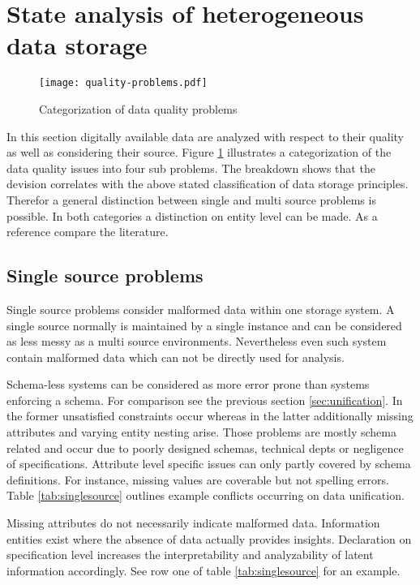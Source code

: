 \section{State analysis of heterogeneous data storage\label{sec:stateanalysis}}

\begin{figure}[htb]
  \centering
  \texttt{[image: quality-problems.pdf]}\\
  \caption{Categorization of data quality problems}\label{fig:qualityproblems}
\end{figure}

In this section digitally available data are analyzed with respect to their quality as well as considering their source. Figure \ref{fig:qualityproblems} illustrates a categorization of the data quality issues into four sub problems. The breakdown shows that the devision correlates with the above stated classification of data storage principles. Therefor a general distinction between single and multi source problems is possible. In both categories a distinction on entity level can be made. As a reference compare the literature\cite{rahm_hai_do_2017}.

\subsection{Single source problems}

Single source problems consider malformed data within one storage system. A single source normally is maintained by a single instance and can be considered as less messy as a multi source environments. Nevertheless even such system contain malformed data which can not be directly used for analysis.

Schema-less systems can be considered as more error prone than systems enforcing a schema. For comparison see the previous section \ref{sec:unification}. In the former unsatisfied constraints occur whereas in the latter additionally missing attributes and varying entity nesting arise. Those problems are mostly schema related and occur due to poorly designed schemas, technical depts or negligence of specifications. Attribute level specific issues can only partly covered by schema definitions. For instance, missing values are coverable but not spelling errors. Table \ref{tab:singlesource} outlines example conflicts occurring on data unification. 

Missing attributes do not necessarily indicate malformed data. Information entities exist where the absence of data actually provides insights. Declaration on specification level increases the interpretability and analyzability of latent information accordingly. See row one of table \ref{tab:singlesource} for an example.

